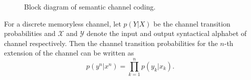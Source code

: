 \documentclass[12pt, draftclsnofoot,onecolumn]{IEEEtran}
\begin{document}
\begin{figure}[htbp]
\setlength{\abovecaptionskip}{0.cm}
\setlength{\belowcaptionskip}{-0.cm}
  \caption{Block diagram of semantic channel coding.}\label{Semantic_Channel_coding}
\end{figure}

For a discrete memoryless channel, let $p(Y|X)$ be the channel transition probabilities and $\mathcal{X}$ and $\mathcal{Y}$ denote the input and output syntactical alphabet of channel respectively. Then the channel transition probabilities for the $n$-th extension of the channel can be written as
\begin{equation}
p(y^n\left|x^n\right.)=\prod_{k=1}^{n}p(y_k\left|x_k\right.).
\end{equation}
\end{document}
